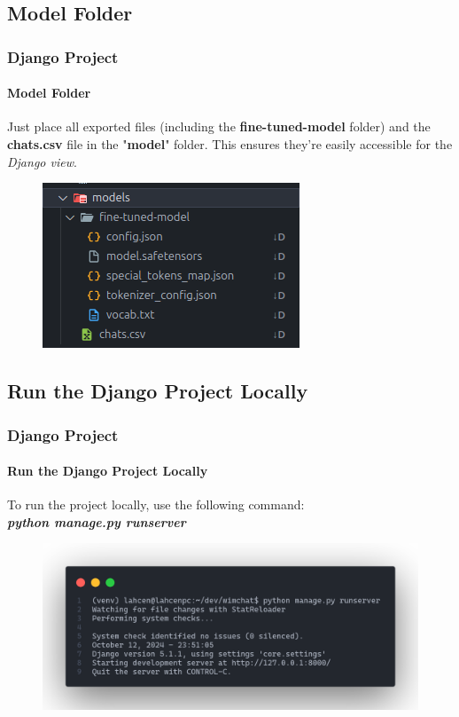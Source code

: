 \documentclass[
	11pt, %
]{beamer}
\begin{document}

\subsection{Model Folder}

\begin{frame}
	\frametitle{Django Project}
	\framesubtitle{Model Folder}
	
	Just place all exported files (including the \textbf{fine-tuned-model} folder) and the \textbf{chats.csv} file in the "\textbf{model}" folder. This ensures they’re easily accessible for the \textit{Django view}.
	
	\begin{figure}
		\includegraphics[width=0.5\linewidth]{model_folder.png}
	\end{figure}
	
\end{frame}


\subsection{Run the Django Project Locally}

\begin{frame}
	\frametitle{Django Project}
	\framesubtitle{Run the Django Project Locally}
	
	To run the project locally, use the following command: \\
	
	\textit{\textbf{python manage.py runserver}}
	
	\begin{figure}
		\includegraphics[width=1\linewidth]{run_project.png}
	\end{figure}
	
\end{frame}
\end{document}
